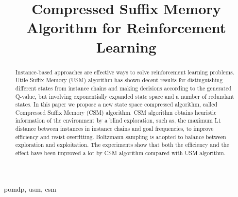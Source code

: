 \documentclass[conference]{IEEEtran}
\begin{document}
	
	\title{Compressed Suffix Memory Algorithm for Reinforcement Learning\\
	}
	\author{
		\and
		\and
	}
	
	\maketitle
	
	\begin{abstract}
		Instance-based approaches are effective ways to solve reinforcement learning problems.
		Utile Suffix Memory (USM) algorithm has shown decent results for distinguishing different
		states from instance chains and making decisions according to the generated Q-value, but involving
		exponentially expanded state space and a number of redundant states. In this paper we
		propose a new state space compressed algorithm, called Compressed Suffix Memory (CSM)
		algorithm. CSM algorithm obtains heuristic information of the environment by a blind
		exploration, such as, the maximum L1 distance between instances in instance chains
		and goal frequencies, to improve efficiency and resist overfitting. Boltzmann sampling
		is adopted to balance between exploration and exploitation. The experiments show that both
		the efficiency and the effect have been improved a lot by CSM algorithm compared with
		USM algorithm.
	\end{abstract}
	
	\begin{IEEEkeywords}
		pomdp, usm, csm
	\end{IEEEkeywords}
	
\end{document}
